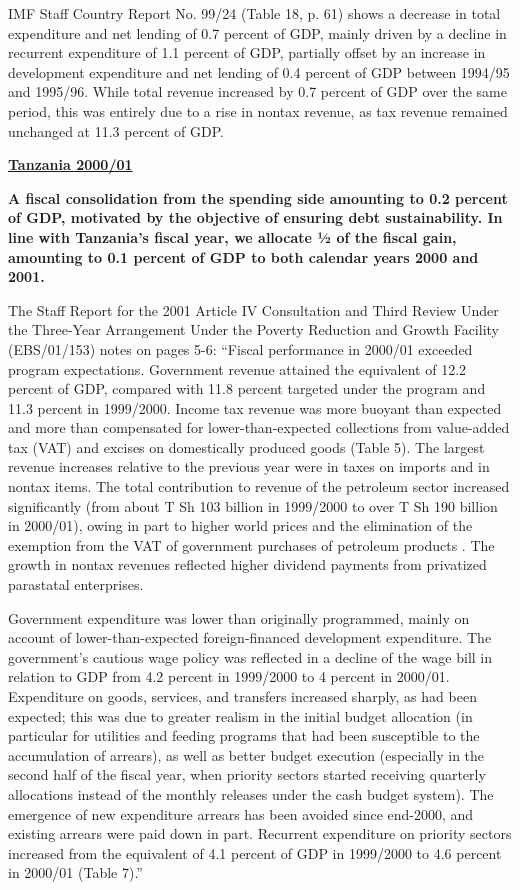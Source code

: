 IMF Staff Country Report No. 99/24 (Table 18, p. 61) shows a decrease in total expenditure and net lending of 0.7 percent of GDP, mainly driven by a decline in recurrent expenditure of 1.1 percent of GDP, partially offset by an increase in development expenditure and net lending of 0.4 percent of GDP between 1994/95 and 1995/96. While total revenue increased by 0.7 percent of GDP over the same period, this was entirely due to a rise in nontax revenue, as tax revenue remained unchanged at 11.3 percent of GDP. 

\textbf{\underline{Tanzania 2000/01}}

\textbf{A fiscal consolidation from the spending side amounting to 0.2 percent of GDP, motivated by the objective of ensuring debt sustainability. In line with Tanzania’s fiscal year, we allocate ½ of the fiscal gain, amounting to  0.1 percent of GDP to both calendar years 2000 and 2001.}

The Staff Report for the 2001 Article IV Consultation and Third Review Under the Three-Year Arrangement Under the Poverty Reduction and Growth Facility (EBS/01/153) notes on pages 5-6: “Fiscal performance in 2000/01 exceeded program expectations. Government revenue attained the equivalent of 12.2 percent of GDP, compared with 11.8 percent targeted under the program and 11.3 percent in 1999/2000. Income tax revenue was more buoyant than expected and more than compensated for lower-than-expected collections from value-added tax (VAT) and excises on domestically produced goods (Table 5). The largest revenue increases relative to the previous year were in taxes on imports and in nontax items.  The total contribution to revenue of the petroleum sector increased significantly (from about T Sh 103 billion in 1999/2000 to over T Sh 190 billion in 2000/01), owing in part to higher world prices and the elimination of the exemption from the VAT of government purchases of petroleum products . The growth in nontax revenues reflected higher dividend payments from privatized parastatal enterprises.

Government expenditure was lower than originally programmed, mainly on account of lower-than-expected foreign-financed development expenditure. The government’s cautious wage policy was reflected in a decline of the wage bill in relation to GDP from 4.2 percent in 1999/2000 to 4 percent in 2000/01. Expenditure on goods, services, and transfers increased sharply, as had been expected; this was due to greater realism in the initial budget allocation (in particular for utilities and feeding programs that had been susceptible to the accumulation of arrears), as well as better budget execution (especially in the second half of the fiscal year, when priority sectors started receiving quarterly allocations instead of the monthly releases under the cash budget system). The emergence of new expenditure arrears has been avoided since end-2000, and existing arrears were paid down in part. Recurrent expenditure on priority sectors increased from the equivalent of 4.1 percent of GDP in 1999/2000 to 4.6 percent in 2000/01 (Table 7).”

